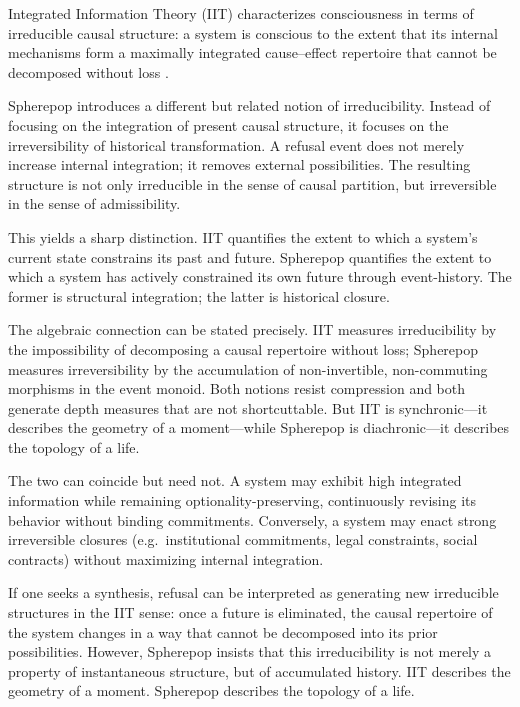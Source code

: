 \documentclass[11pt]{article}
\begin{document}
Integrated Information Theory (IIT) characterizes consciousness in terms of
irreducible causal structure: a system is conscious to the extent that its
internal mechanisms form a maximally integrated cause--effect repertoire that
cannot be decomposed without loss \cite{tononi2008consciousness,tononi2016phi}.

Spherepop introduces a different but related notion of irreducibility. Instead
of focusing on the integration of present causal structure, it focuses on the
irreversibility of historical transformation. A refusal event does not merely
increase internal integration; it removes external possibilities. The resulting
structure is not only irreducible in the sense of causal partition, but
irreversible in the sense of admissibility.

This yields a sharp distinction. IIT quantifies the extent to which a system's
current state constrains its past and future. Spherepop quantifies the extent to
which a system has actively constrained its own future through event-history.
The former is structural integration; the latter is historical closure.

The algebraic connection can be stated precisely. IIT measures irreducibility
by the impossibility of decomposing a causal repertoire without loss;
Spherepop measures irreversibility by the accumulation of non-invertible,
non-commuting morphisms in the event monoid. Both notions resist compression
and both generate depth measures that are not shortcuttable. But IIT is
synchronic---it describes the geometry of a moment---while Spherepop is
diachronic---it describes the topology of a life.

The two can coincide but need not. A system may exhibit high integrated
information while remaining optionality-preserving, continuously revising its
behavior without binding commitments. Conversely, a system may enact strong
irreversible closures (e.g.\ institutional commitments, legal constraints, social
contracts) without maximizing internal integration.

If one seeks a synthesis, refusal can be interpreted as generating new
irreducible structures in the IIT sense: once a future is eliminated, the causal
repertoire of the system changes in a way that cannot be decomposed into its
prior possibilities. However, Spherepop insists that this irreducibility is not
merely a property of instantaneous structure, but of accumulated history.
IIT describes the geometry of a moment. Spherepop describes the topology of a
life.
\end{document}
